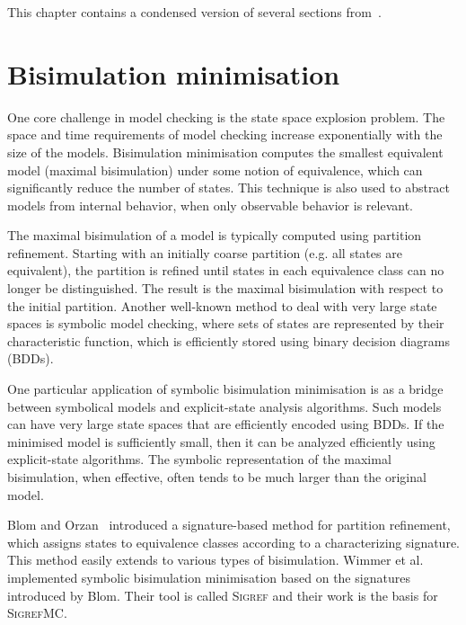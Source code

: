 
This chapter contains a condensed version of several sections from~\cite{DBLP:conf/tacas/DijkP16}.

\section{Bisimulation minimisation}

One core challenge in model checking is the state space explosion problem.
The space and time requirements of model checking
increase exponentially with the size of the models.
Bisimulation minimisation computes the smallest equivalent model (maximal bisimulation) under some notion of equivalence, which can significantly reduce the number of states.
This technique is also used to abstract models from internal behavior, when only observable behavior is relevant.




The maximal bisimulation of a model is typically computed using
partition refinement.
Starting with an initially coarse partition (e.g. all states are equivalent),
the partition is refined until states in each equivalence class can no longer be distinguished.
The result is the maximal bisimulation with respect to the initial partition.
%
%
%
Another well-known method to deal with very large state spaces is symbolic model checking, where sets of states are represented by their characteristic function, which is efficiently stored using  binary decision diagrams (BDDs).


One particular application of symbolic bisimulation minimisation is as a bridge between symbolical models and explicit-state analysis algorithms.
Such models can have very large state spaces that are efficiently encoded using BDDs.
If the minimised model is sufficiently small, then it can be analyzed efficiently using explicit-state algorithms.
The symbolic representation of the maximal bisimulation, when effective, often tends to be much larger than the original model.



Blom and Orzan~\cite{DBLP:journals/entcs/BlomO03} introduced a signature-based method for partition refinement, which assigns states to equivalence classes according to a characterizing signature.
This method easily extends to various types of bisimulation.
Wimmer et al. \cite{DBLP:conf/glvlsi/WimmerHB07,DBLP:conf/atva/WimmerHHSB06} implemented symbolic bisimulation minimisation based on the signatures introduced by Blom.
Their tool is called \textsc{Sigref} and their work is the basis for \textsc{SigrefMC}.



